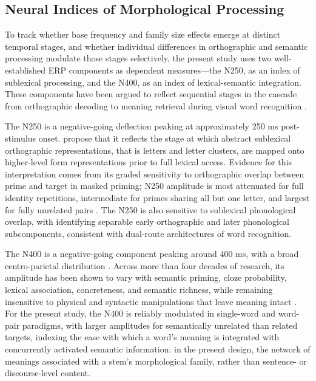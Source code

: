 \documentclass[utf8]{FrontiersinHarvard} %
\begin{document}
	
	\subsection{Neural Indices of Morphological Processing}
	
	To track whether base frequency and family size effects emerge at distinct temporal stages, and whether individual differences in orthographic and semantic processing modulate those stages selectively, the present study uses two well-established ERP components as dependent measures---the N250, as an index of sublexical processing, and the N400, as an index of lexical-semantic integration. These components have been argued to reflect sequential stages in the cascade from orthographic decoding to meaning retrieval during visual word recognition \citep{graingerWatchingWordGo2009}.
	
	The N250 is a negative-going deflection peaking at approximately 250 ms post-stimulus onset. \citet{holcombTimeCourseVisual2006} propose that it reflects the stage at which abstract sublexical orthographic representations, that is letters and letter clusters, are mapped onto higher-level form representations prior to full lexical access. Evidence for this interpretation comes from its graded sensitivity to orthographic overlap between prime and target in masked priming; N250 amplitude is most attenuated for full identity repetitions, intermediate for primes sharing all but one letter, and largest for fully unrelated pairs \citep{holcombTimeCourseVisual2006, holcomb_exploring_2007}. The N250 is also sensitive to sublexical phonological overlap, with \citet{graingerTimeCourseOrthographic2006} identifying separable early orthographic and later phonological subcomponents, consistent with dual-route architectures of word recognition.
	
	The N400 is a negative-going component peaking around 400 ms, with a broad centro-parietal distribution \citep{kutasReadingSenselessSentences1980}. Across more than four decades of research, its amplitude has been shown to vary with semantic priming, cloze probability, lexical association, concreteness, and semantic richness, while remaining insensitive to physical and syntactic manipulations that leave meaning intact \citep{kutasThirtyYearsCounting2011}. For the present study, the N400 is reliably modulated in single-word and word-pair paradigms, with larger amplitudes for semantically unrelated than related targets, indexing the ease with which a word's meaning is integrated with concurrently activated semantic information: in the present design, the network of meanings associated with a stem's morphological family, rather than sentence- or discourse-level content.
	
\end{document}
